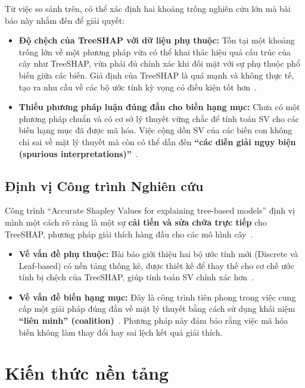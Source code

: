 \documentclass[12pt, a4paper]{article}
\theoremstyle{plain}
\theoremstyle{proposition}
\theoremstyle{lemma}
\begin{document}
Từ việc so sánh trên, có thể xác định hai khoảng trống nghiên cứu lớn mà bài báo này nhắm đến để giải quyết:
\begin{itemize}
    \item \textbf{Độ chệch của TreeSHAP với dữ liệu phụ thuộc:} Tồn tại một khoảng trống lớn về một phương pháp vừa có thể khai thác hiệu quả cấu trúc của cây như TreeSHAP, vừa phải đủ chính xác khi đối mặt với sự phụ thuộc phổ biến giữa các biến. Giả định của TreeSHAP là quá mạnh và không thực tế, tạo ra nhu cầu về các bộ ước tính kỳ vọng có điều kiện tốt hơn~\citep{aas2020explaining}.
    \item \textbf{Thiếu phương pháp luận đúng đắn cho biến hạng mục:} Chưa có một phương pháp chuẩn và có cơ sở lý thuyết vững chắc để tính toán SV cho các biến hạng mục đã được mã hóa. Việc cộng dồn SV của các biến con không chỉ sai về mặt lý thuyết mà còn có thể dẫn đến \textbf{``các diễn giải ngụy biện (spurious interpretations)''}~\citep{aas2020explaining}.
\end{itemize}

\subsection{Định vị Công trình Nghiên cứu}

Công trình ``Accurate Shapley Values for explaining tree-based models'' định vị mình một cách rõ ràng là một sự \textbf{cải tiến và sửa chữa trực tiếp} cho TreeSHAP, phương pháp giải thích hàng đầu cho các mô hình cây~\citep{lundberg2020local2global}.

\begin{itemize}
    \item \textbf{Về vấn đề phụ thuộc:} Bài báo giới thiệu hai bộ ước tính mới (Discrete và Leaf-based) có nền tảng thống kê, được thiết kế để thay thế cho cơ chế ước tính bị chệch của TreeSHAP, giúp tính toán SV chính xác hơn~\citep{aas2020explaining}.
    \item \textbf{Về vấn đề biến hạng mục:} Đây là công trình tiên phong trong việc cung cấp một giải pháp đúng đắn về mặt lý thuyết bằng cách sử dụng khái niệm \textbf{``liên minh'' (coalition)}~\citep{aas2020explaining}. Phương pháp này đảm bảo rằng việc mã hóa biến không làm thay đổi hay sai lệch kết quả giải thích.
\end{itemize}


\section{Kiến thức nền tảng}
\end{document}
